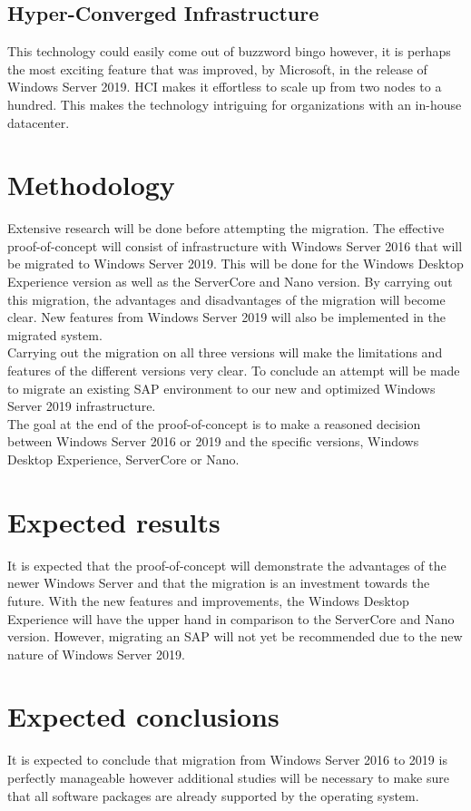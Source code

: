\subsection{Hyper-Converged Infrastructure}
This technology could easily come out of buzzword bingo however, it is perhaps the most exciting feature that was improved, by Microsoft, in the release of Windows Server 2019. HCI makes it effortless to scale up from two nodes to a hundred. This makes the technology intriguing for organizations with an in-house datacenter.
\section{Methodology}\label{sec:methodology}
Extensive research will be done before attempting the migration. The effective proof-of-concept will consist of infrastructure with Windows Server 2016 that will be migrated to Windows Server 2019. This will be done for the Windows Desktop Experience version as well as the ServerCore and Nano version. By carrying out this migration, the advantages and disadvantages of the migration will become clear. New features from Windows Server 2019 will also be implemented in the migrated system. 
\\
Carrying out the migration on all three versions will make the limitations and features of the different versions very clear. 
To conclude an attempt will be made to migrate an existing SAP environment to our new and optimized Windows Server 2019 infrastructure.
\\
The goal at the end of the proof-of-concept is to make a reasoned decision between Windows Server 2016 or 2019 and the specific versions, Windows Desktop Experience, ServerCore or Nano.
\section{Expected results}\label{sec:anticipated_results}
It is expected that the proof-of-concept will demonstrate the advantages of the newer Windows Server and that the migration is an investment towards the future. With the new features and improvements, the Windows Desktop Experience will have the upper hand in comparison to the ServerCore and Nano version. However, migrating an SAP will not yet be recommended due to the new nature of Windows Server 2019. 
\section{Expected conclusions}\label{sec:anticipated_conclusions}
It is expected to conclude that migration from Windows Server 2016 to 2019 is perfectly manageable however additional studies will be necessary to make sure that all software packages are already supported by the operating system.